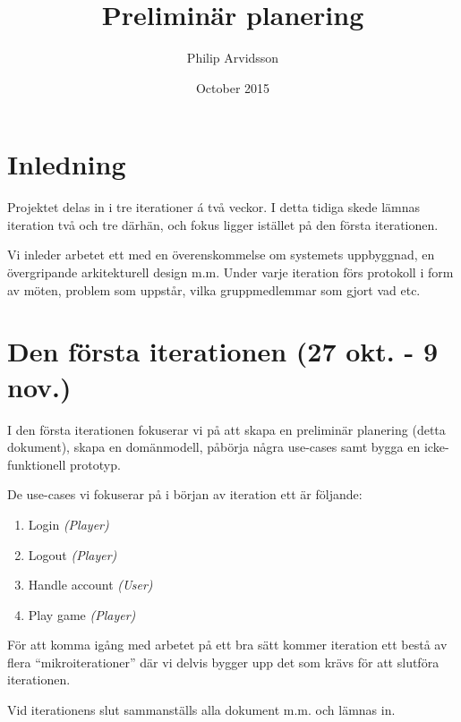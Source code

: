 \documentclass[a4paper]{article}
\title{Preliminär planering}
\author{Philip Arvidsson}
\date{October 2015}
\begin{document}
    \maketitle

    \section{Inledning}
    Projektet delas in i tre iterationer á två veckor. I detta tidiga skede
    lämnas iteration två och tre därhän, och fokus ligger istället på den
    första iterationen.

    Vi inleder arbetet ett med en överenskommelse om systemets uppbyggnad,
    en övergripande arkitekturell design m.m. Under varje iteration förs
    protokoll i form av möten, problem som uppstår, vilka gruppmedlemmar som
    gjort vad etc.

    \section{Den första iterationen (27 okt. - 9 nov.)}

    I den första iterationen fokuserar vi på att skapa en preliminär planering
    (detta dokument), skapa en domänmodell, påbörja några use-cases samt bygga
    en icke-funktionell prototyp.

    De use-cases vi fokuserar på i början av iteration ett är följande:

    \begin{enumerate}
        \item Login \textit{(Player)}
        \item Logout \textit{(Player)}
        \item Handle account \textit{(User)}
        \item Play game \textit{(Player)}
    \end{enumerate}

    För att komma igång med arbetet på ett bra sätt kommer iteration ett bestå
    av flera ``mikroiterationer'' där vi delvis bygger upp det som krävs för att
    slutföra iterationen.

    Vid iterationens slut sammanställs alla dokument m.m. och lämnas in.
\end{document}
